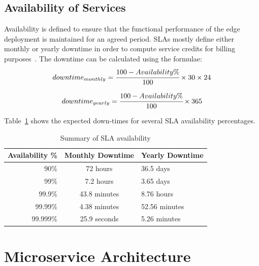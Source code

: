\subsection{Availability of Services}
\label{subsec:ch2-svc-availability}
Availability is defined to ensure that the functional performance of the edge deployment is maintained for an agreed period. SLAs mostly define either monthly or yearly downtime in order to compute service credits for billing purposes~\cite{mirobi2015service}. The downtime can be calculated using the formulae:
\begin{equation}
    downtime_{monthly} = \cfrac{100 - Availability\%}{100} \times 30 \times 24
\end{equation}

\begin{equation}
    downtime_{yearly} = \cfrac{100 - Availability\%}{100} \times 365
\end{equation}

Table~\ref{table:sla-availability} shows the expected down-times for several SLA availability percentages.

\begin{table}
    \caption{Summary of SLA availability}\label{table:sla-availability}
    \centering
    \begin{tabular}{rcl}
        \toprule
        \textbf{Availability \%} & \textbf{Monthly Downtime} & \textbf{Yearly Downtime}\\
        \midrule
        90\% & 72 hours & 36.5 days\\
        99\% & 7.2 hours & 3.65 days\\
        99.9\% & 43.8 minutes & 8.76 hours\\
        99.99\% & 4.38 minutes & 52.56 minutes\\
        99.999\% & 25.9 seconds & 5.26 minutes\\
        \toprule
    \end{tabular}
\end{table}

\section{Microservice Architecture}
\label{sec:ch2-micro-svc-arc}

